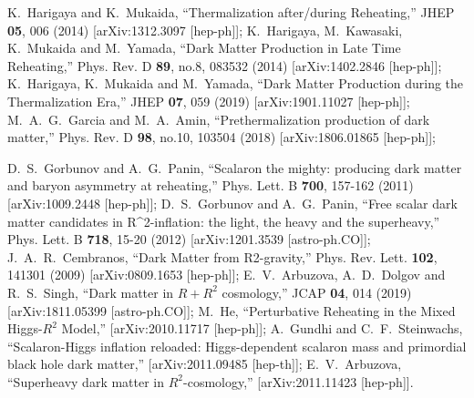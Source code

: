 \documentclass[%
aps,prd,nofootinbib,showkeys,a4paper,10pt
]{revtex4-2}
\begin{document}
\begin{thebibliography}{10}
K.~Harigaya and K.~Mukaida,
``Thermalization after/during Reheating,''
JHEP \textbf{05}, 006 (2014)
[arXiv:1312.3097 [hep-ph]];
K.~Harigaya, M.~Kawasaki, K.~Mukaida and M.~Yamada,
``Dark Matter Production in Late Time Reheating,''
Phys. Rev. D \textbf{89}, no.8, 083532 (2014)
[arXiv:1402.2846 [hep-ph]];
K.~Harigaya, K.~Mukaida and M.~Yamada,
``Dark Matter Production during the Thermalization Era,''
JHEP \textbf{07}, 059 (2019)
[arXiv:1901.11027 [hep-ph]];
M.~A.~G.~Garcia and M.~A.~Amin,
``Prethermalization production of dark matter,''
Phys. Rev. D \textbf{98}, no.10, 103504 (2018)
[arXiv:1806.01865 [hep-ph]];




D.~S.~Gorbunov and A.~G.~Panin,
``Scalaron the mighty: producing dark matter and baryon asymmetry at reheating,''
Phys. Lett. B \textbf{700}, 157-162 (2011)
[arXiv:1009.2448 [hep-ph]];
D.~S.~Gorbunov and A.~G.~Panin,
``Free scalar dark matter candidates in R\textasciicircum{}2-inflation: the light, the heavy and the superheavy,''
Phys. Lett. B \textbf{718}, 15-20 (2012)
[arXiv:1201.3539 [astro-ph.CO]];
J.~A.~R.~Cembranos,
``Dark Matter from R2-gravity,''
Phys. Rev. Lett. \textbf{102}, 141301 (2009)
[arXiv:0809.1653 [hep-ph]];
E.~V.~Arbuzova, A.~D.~Dolgov and R.~S.~Singh,
``Dark matter in $R+R^2$ cosmology,''
JCAP \textbf{04}, 014 (2019)
[arXiv:1811.05399 [astro-ph.CO]];
M.~He,
``Perturbative Reheating in the Mixed Higgs-$R^2$ Model,''
[arXiv:2010.11717 [hep-ph]];
A.~Gundhi and C.~F.~Steinwachs,
``Scalaron-Higgs inflation reloaded: Higgs-dependent scalaron mass and primordial black hole dark matter,''
[arXiv:2011.09485 [hep-th]];
E.~V.~Arbuzova,
``Superheavy dark matter in $R^2$-cosmology,''
[arXiv:2011.11423 [hep-ph]].



\end{thebibliography}
\end{document}
